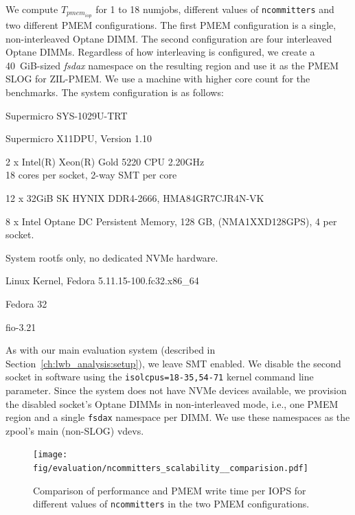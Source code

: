 \documentclass[12pt,a4paper,twoside]{book}
\begin{document}
We compute $T_{pmem_{iop}}$ for 1 to 18 numjobs, different values of \lstinline{ncommitters} and two different PMEM configurations.
The first PMEM configuration is a single, non-interleaved Optane DIMM.
The second configuration are four interleaved Optane DIMMs.
Regardless of how interleaving is configured, we create a 40~GiB-sized \textit{fsdax} namespace on the resulting region and use it as the PMEM SLOG for ZIL-PMEM.
We use a machine with higher core count for the benchmarks.
The system configuration is as follows:
\begin{description}[noitemsep,leftmargin=1.5cm,labelindent=1cm]
    \item[System] Supermicro SYS-1029U-TRT
    \item[Mainboard] Supermicro X11DPU, Version 1.10
    \item[CPU] 2 x Intel(R) Xeon(R) Gold 5220 CPU \@ 2.20GHz \\
        18 cores per socket, 2-way SMT per core
    \item[DRAM] 12 x 32GiB SK HYNIX DDR4-2666, HMA84GR7CJR4N-VK  %
    \item[PMEM] 8 x Intel Optane DC Persistent Memory, 128 GB, (NMA1XXD128GPS), 4 per socket.
    \item[NVMe] System rootfs only, no dedicated NVMe hardware.
    \item[Kernel] Linux Kernel, Fedora 5.11.15-100.fc32.x86\_64
    \item[Userland] Fedora 32
    \item[fio] fio-3.21
\end{description}
As with our main evaluation system (described in Section~\ref{ch:lwb_analysis:setup}), we leave SMT enabled.
We disable the second socket in software using the \lstinline{isolcpus=18-35,54-71} kernel command line parameter.
Since the system does not have NVMe devices available, we provision the disabled socket's Optane DIMMs in non-interleaved mode, i.e., one PMEM region and a single \lstinline{fsdax} namespace per DIMM.
We use these namespaces as the zpool's main (non-SLOG) vdevs.

\begin{figure}
    \centering
    \texttt{[image: fig/evaluation/ncommitters\_scalability\_\_comparision.pdf]}
    \caption{Comparison of performance and PMEM write time per IOPS for different values of \lstinline{ncommitters} in the two PMEM configurations.}
    \label{fig:eval:ncommitters_scalability:main}
\end{figure}
\end{document}
